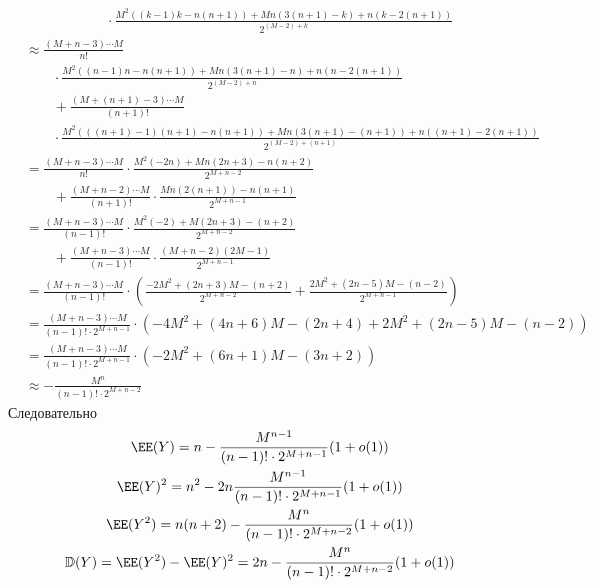 \documentclass[12pt,a4paper]{article}
\newcommand{\DD}{\ensuremath{\mathbb{D}}\xspace}
\begin{document}
\begin{enumproblem}
\begin{align*}
            &\qquad \cdot \frac{M^2 ((k-1)k - n(n+1)) + Mn(3(n+1) - k) + n(k - 2(n+1))}{2^{(M-2)+k}}
        \end{align*}
        \begin{align*}
            &\approx \frac{(M+n-3) \cdots M}{n!}\\
            &\qquad \cdot \frac{M^2 ((n-1)n - n(n+1)) + Mn(3(n+1) - n) + n(n - 2(n+1))}{2^{(M-2)+n}}\\
            &\qquad + \frac{(M+(n+1)-3) \cdots M}{(n+1)!}\\
            &\qquad \cdot \frac{M^2 (((n+1)-1)(n+1) - n(n+1)) + Mn(3(n+1) - (n+1)) + n((n+1) - 2(n+1))}{2^{(M-2)+(n+1)}}\\
            &= \frac{(M+n-3) \cdots M}{n!} \cdot \frac{M^2 (-2n) + Mn(2n+3) - n(n+2)}{2^{M+n-2}}\\
            &\qquad + \frac{(M+n-2) \cdots M}{(n+1)!} \cdot \frac{Mn(2(n+1)) - n(n+1)}{2^{M+n-1}}\\
            &= \frac{(M+n-3) \cdots M}{(n-1)!} \cdot \frac{M^2 (-2) + M(2n+3) - (n+2)}{2^{M+n-2}}\\
            &\qquad + \frac{(M+n-3) \cdots M}{(n-1)!} \cdot \frac{(M+n-2)(2M - 1)}{2^{M+n-1}}\\
            &= \frac{(M+n-3) \cdots M}{(n-1)!} \cdot \left(\frac{-2M^2 + (2n+3)M - (n+2)}{2^{M+n-2}} + \frac{2M^2 + (2n - 5)M - (n-2)}{2^{M+n-1}}\right)\\
            &= \frac{(M+n-3) \cdots M}{(n-1)! \cdot 2^{M+n-1}} \cdot \left(-4M^2 + (4n+6)M - (2n+4) + 2M^2 + (2n - 5)M - (n-2)\right)\\
            &= \frac{(M+n-3) \cdots M}{(n-1)! \cdot 2^{M+n-1}} \cdot \left(-2M^2 + (6n+1)M - (3n+2)\right)\\
            &\approx -\frac{M^{n}}{(n-1)! \cdot 2^{M+n-2}}
        \end{align*}
        Следовательно
        \begin{gather*}
            \EE(Y) = n - \frac{M^{n-1}}{(n-1)! \cdot 2^{M+n-1}} (1 + o(1))\\
            \EE(Y)^2 = n^2 - 2n\frac{M^{n-1}}{(n-1)! \cdot 2^{M+n-1}} (1 + o(1))\\
            \EE(Y^2) = n(n+2) - \frac{M^{n}}{(n-1)! \cdot 2^{M+n-2}} (1 + o(1))\\
            \DD(Y) = \EE(Y^2) - \EE(Y)^2 = 2n - \frac{M^{n}}{(n-1)! \cdot 2^{M+n-2}} (1 + o(1))\\
        \end{gather*}
    \end{enumproblem}
\end{document}
